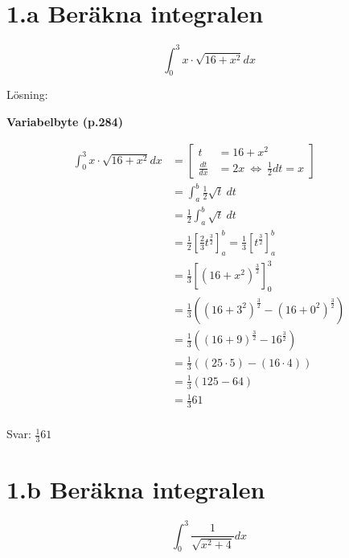 \documentclass[11pt]{article}
\begin{document}
\section{1.a Beräkna integralen}

\[
    \int_0^3 x \cdot \sqrt{16 + x^2} dx
\]

Lösning:

\textbf{Variabelbyte (p.284)}

\begin{align*}
    \int_0^3 x \cdot \sqrt{16 + x^2} dx &= \left[\begin{aligned}
            t &= 16 + x^2 \\
            \frac{dt}{dx} &= 2x \ \Leftrightarrow \ \frac{1}{2}dt = x
        \end{aligned}\right] \\
        &= \int_{a}^{b} \frac{1}{2}\sqrt{t}\ dt \\
        &= \frac{1}{2} \int_{a}^{b}\sqrt{t}\ dt \\
        &= \frac{1}{2} \left[\frac{2}{3}t^{\frac{3}{2}}\right]_{a}^{b}
            = \frac{1}{3} \left[t^{\frac{3}{2}}\right]_{a}^{b} \\
        &= \frac{1}{3} \left[\left(16 + x^2\right)^{\frac{3}{2}}\right]_{0}^{3} \\
        &= \frac{1}{3} \left(\left(16 + 3^2\right)^{\frac{3}{2}} - \left(16 + 0^2\right)^{\frac{3}{2}}\right) \\
        &= \frac{1}{3} \left((16 + 9)^{\frac{3}{2}} - 16^{\frac{3}{2}}\right) \\
        &= \frac{1}{3} \left((25 \cdot 5) - (16 \cdot 4)\right) \\
        &= \frac{1}{3} (125 - 64) \\
        &= \frac{1}{3} 61 \\
\end{align*}

Svar: $\displaystyle\frac{1}{3} 61$

\newpage
\section{1.b Beräkna integralen}

\[
    \int_0^3 \frac{1}{\sqrt{x^2 + 4}} dx
\]

%
\end{document}
